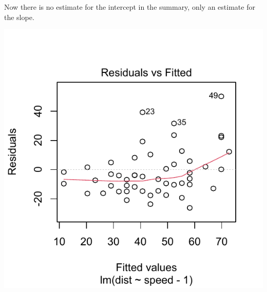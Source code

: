 \documentclass[krantz2]{krantz}\usepackage{knitr}
\begin{document}
Now there is no estimate for the intercept in the summary, only an estimate for the slope.

\begin{knitrout}\footnotesize
{}\color{fgcolor}\begin{kframe}
\begin{alltt}
  \hlstd{=} \hlstd{)}
\end{alltt}
\end{kframe}

{\centering \includegraphics[width=.54\textwidth]{figure/pos-models-2a-1}

}



\end{knitrout}
\end{document}
